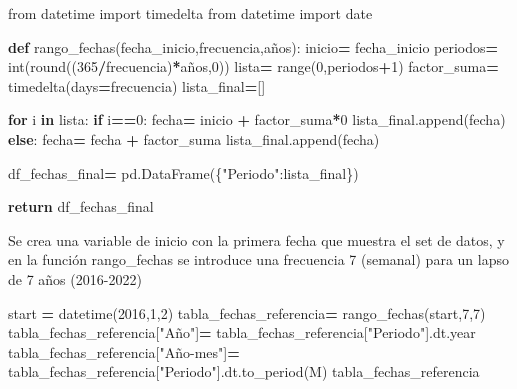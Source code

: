 \documentclass[
]{book}
\newenvironment{Shaded}{\begin{snugshade}}{\end{snugshade}}
\newcommand{\BuiltInTok}[1]{#1}
\newcommand{\ControlFlowTok}[1]{\textcolor[rgb]{0.13,0.29,0.53}{\textbf{#1}}}
\newcommand{\DecValTok}[1]{\textcolor[rgb]{0.00,0.00,0.81}{#1}}
\newcommand{\ImportTok}[1]{#1}
\newcommand{\KeywordTok}[1]{\textcolor[rgb]{0.13,0.29,0.53}{\textbf{#1}}}
\newcommand{\NormalTok}[1]{#1}
\newcommand{\OperatorTok}[1]{\textcolor[rgb]{0.81,0.36,0.00}{\textbf{#1}}}
\newcommand{\StringTok}[1]{\textcolor[rgb]{0.31,0.60,0.02}{#1}}
\begin{document}
\begin{Shaded}
\begin{Highlighting}[]

\ImportTok{from}\NormalTok{ datetime }\ImportTok{import}\NormalTok{ timedelta}
\ImportTok{from}\NormalTok{ datetime }\ImportTok{import}\NormalTok{ date}

\KeywordTok{def}\NormalTok{ rango\_fechas(fecha\_inicio,frecuencia,años):}
\NormalTok{    inicio}\OperatorTok{=}\NormalTok{ fecha\_inicio}
\NormalTok{    periodos}\OperatorTok{=} \BuiltInTok{int}\NormalTok{(}\BuiltInTok{round}\NormalTok{((}\DecValTok{365}\OperatorTok{/}\NormalTok{frecuencia)}\OperatorTok{*}\NormalTok{años,}\DecValTok{0}\NormalTok{))}
\NormalTok{    lista}\OperatorTok{=} \BuiltInTok{range}\NormalTok{(}\DecValTok{0}\NormalTok{,periodos}\OperatorTok{+}\DecValTok{1}\NormalTok{)}
\NormalTok{    factor\_suma}\OperatorTok{=}\NormalTok{ timedelta(days}\OperatorTok{=}\NormalTok{frecuencia)}
\NormalTok{    lista\_final}\OperatorTok{=}\NormalTok{[]}
    
    \ControlFlowTok{for}\NormalTok{ i }\KeywordTok{in}\NormalTok{ lista: }
        \ControlFlowTok{if}\NormalTok{ i}\OperatorTok{==}\DecValTok{0}\NormalTok{:}
\NormalTok{            fecha}\OperatorTok{=}\NormalTok{ inicio }\OperatorTok{+}\NormalTok{ factor\_suma}\OperatorTok{*}\DecValTok{0}
\NormalTok{            lista\_final.append(fecha)}
        \ControlFlowTok{else}\NormalTok{:}
\NormalTok{            fecha}\OperatorTok{=}\NormalTok{ fecha }\OperatorTok{+}\NormalTok{ factor\_suma}
\NormalTok{            lista\_final.append(fecha)}
    
\NormalTok{    df\_fechas\_final}\OperatorTok{=}\NormalTok{ pd.DataFrame(\{}\StringTok{"Periodo"}\NormalTok{:lista\_final\})}
    
    \ControlFlowTok{return}\NormalTok{ df\_fechas\_final}
\end{Highlighting}
\end{Shaded}

Se crea una variable de inicio con la primera fecha que muestra el set de datos, y en la función rango\_fechas se introduce una frecuencia 7 (semanal) para un lapso de 7 años (2016-2022)

\begin{Shaded}
\begin{Highlighting}[]
\NormalTok{start }\OperatorTok{=}\NormalTok{ datetime(}\DecValTok{2016}\NormalTok{,}\DecValTok{1}\NormalTok{,}\DecValTok{2}\NormalTok{)}
\NormalTok{tabla\_fechas\_referencia}\OperatorTok{=}\NormalTok{ rango\_fechas(start,}\DecValTok{7}\NormalTok{,}\DecValTok{7}\NormalTok{)}
\NormalTok{tabla\_fechas\_referencia[}\StringTok{"Año"}\NormalTok{]}\OperatorTok{=}\NormalTok{ tabla\_fechas\_referencia[}\StringTok{"Periodo"}\NormalTok{].dt.year}
\NormalTok{tabla\_fechas\_referencia[}\StringTok{"Año{-}mes"}\NormalTok{]}\OperatorTok{=}\NormalTok{ tabla\_fechas\_referencia[}\StringTok{"Periodo"}\NormalTok{].dt.to\_period(}\StringTok{\textquotesingle{}M\textquotesingle{}}\NormalTok{)}
\NormalTok{tabla\_fechas\_referencia}
\end{Highlighting}
\end{Shaded}
\end{document}
